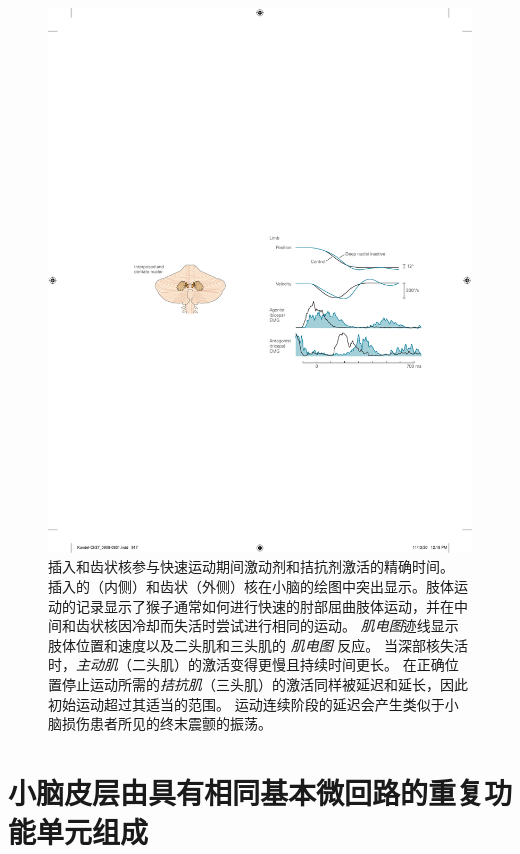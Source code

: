 \begin{figure}[htbp]
	\centering
	\includegraphics[width=1.0\linewidth]{chap37/fig_37_7}
	\caption{插入和齿状核参与快速运动期间激动剂和拮抗剂激活的精确时间。
		插入的（内侧）和齿状（外侧）核在小脑的绘图中突出显示。肢体运动的记录显示了猴子通常如何进行快速的肘部屈曲肢体运动，并在中间和齿状核因冷却而失活时尝试进行相同的运动。
		\textit{肌电图}迹线显示肢体位置和速度以及二头肌和三头肌的 \textit{肌电图} 反应。
		当深部核失活时，\textit{主动肌}（二头肌）的激活变得更慢且持续时间更长。
		在正确位置停止运动所需的\textit{拮抗肌}（三头肌）的激活同样被延迟和延长，因此初始运动超过其适当的范围。
		运动连续阶段的延迟会产生类似于小脑损伤患者所见的终末震颤的振荡。}
	\label{fig:37_7}
\end{figure}



\section{小脑皮层由具有相同基本微回路的重复功能单元组成}

